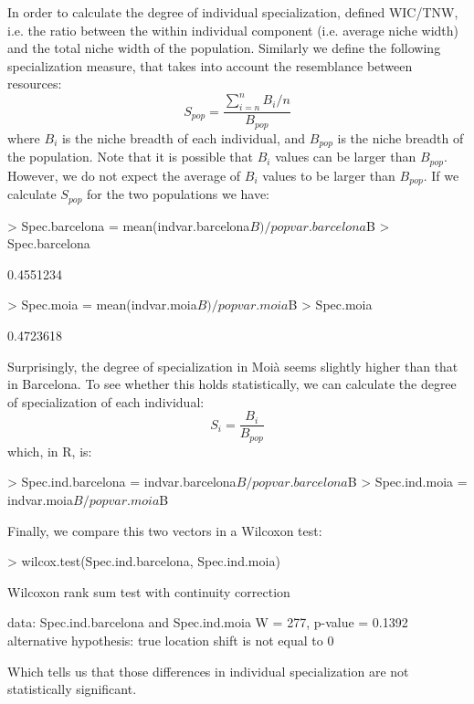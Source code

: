 \documentclass[11pt,a4paper]{article}
\begin{document}
In order to calculate the degree of individual specialization, \citet{Bolnick2002} defined WIC/TNW, i.e. the ratio between the within individual component (i.e. average niche width) and the total niche width of the population. Similarly we define the following specialization measure, that takes into account the resemblance between resources:
\[
S_{pop} = \frac{\sum_{i=n}^n{B_i}/n}{B_{pop}}
\]
where $B_i$ is the niche breadth of each individual, and $B_{pop}$ is the niche breadth of the population. Note that it is possible that $B_i$ values can be larger than $B_{pop}$. However, we do not expect the average of $B_i$ values to be larger than $B_{pop}$. If we calculate $S_{pop}$ for the two populations we have:
\begin{Schunk}
\begin{Sinput}
> Spec.barcelona = mean(indvar.barcelona$B)/popvar.barcelona$B
> Spec.barcelona
\end{Sinput}
\begin{Soutput}
[1] 0.4551234
\end{Soutput}
\begin{Sinput}
> Spec.moia = mean(indvar.moia$B)/popvar.moia$B
> Spec.moia
\end{Sinput}
\begin{Soutput}
[1] 0.4723618
\end{Soutput}
\end{Schunk}
Surprisingly, the degree of specialization in Moià seems slightly higher than that in Barcelona. To see whether this holds statistically, we can calculate the degree of specialization of each individual:
\[
S_i = \frac{B_i}{B_{pop}}
\]
which, in R, is:
\begin{Schunk}
\begin{Sinput}
> Spec.ind.barcelona = indvar.barcelona$B/popvar.barcelona$B
> Spec.ind.moia = indvar.moia$B/popvar.moia$B
\end{Sinput}
\end{Schunk}
Finally, we compare this two vectors in a Wilcoxon test:
\begin{Schunk}
\begin{Sinput}
> wilcox.test(Spec.ind.barcelona, Spec.ind.moia)
\end{Sinput}
\begin{Soutput}
	Wilcoxon rank sum test with continuity correction

data:  Spec.ind.barcelona and Spec.ind.moia
W = 277, p-value = 0.1392
alternative hypothesis: true location shift is not equal to 0
\end{Soutput}
\end{Schunk}
Which tells us that those differences in individual specialization are not statistically significant.
\end{document}
